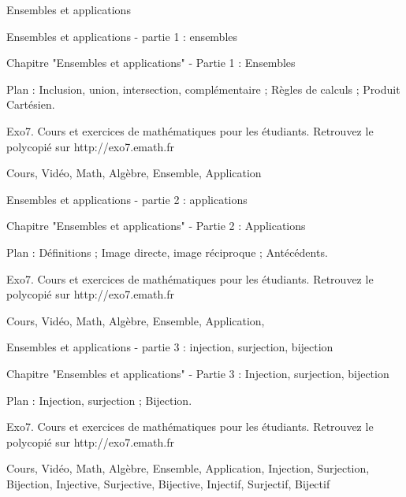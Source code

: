 
 Ensembles et applications





Ensembles et applications - partie 1 : ensembles

Chapitre "Ensembles et applications" - Partie 1 : Ensembles

Plan : Inclusion, union, intersection, complémentaire ; Règles de calculs ; Produit Cartésien.

Exo7. Cours et exercices de mathématiques pour les étudiants.
Retrouvez le polycopié sur http://exo7.emath.fr


Cours, Vidéo, Math, Algèbre, Ensemble, Application




Ensembles et applications - partie 2 : applications

Chapitre "Ensembles et applications" - Partie 2 : Applications

Plan : Définitions ; Image directe, image réciproque ; Antécédents.

Exo7. Cours et exercices de mathématiques pour les étudiants.
Retrouvez le polycopié sur http://exo7.emath.fr


Cours, Vidéo, Math, Algèbre, Ensemble, Application,




Ensembles et applications - partie 3 : injection, surjection, bijection 

Chapitre "Ensembles et applications" - Partie 3 : Injection, surjection, bijection

Plan : Injection, surjection ; Bijection.

Exo7. Cours et exercices de mathématiques pour les étudiants.
Retrouvez le polycopié sur http://exo7.emath.fr


Cours, Vidéo, Math, Algèbre, Ensemble, Application, Injection, Surjection, Bijection, Injective, Surjective, Bijective,
Injectif, Surjectif, Bijectif


